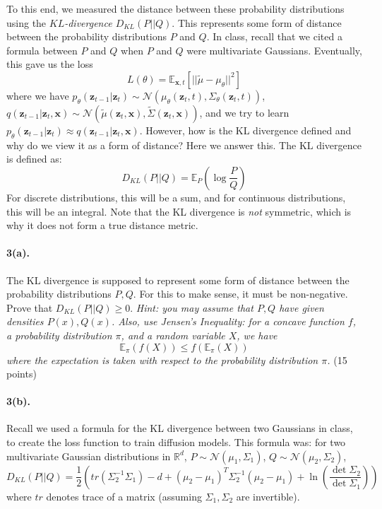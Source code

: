 \documentclass{article}
\begin{document}
To this end, we measured the distance between these probability distributions using the \textit{$KL$-divergence $D_{KL}(P||Q)$}. This represents some form of distance between the probability distributions $P$ and $Q$. In class, recall that we cited a formula between $P$ and $Q$ when $P$ and $Q$ were multivariate Gaussians. Eventually, this gave us the loss
\[ L(\theta) = \mathbb{E}_{\mathbf{x},t}[||\tilde{\mu}-\mu_{\theta}||^2]\]
where we have $p_{\theta}(\mathbf{z}_{t-1}|\mathbf{z}_t) \sim \mathcal{N}(\mu_{\theta}(\mathbf{z}_t,t),\Sigma_{\theta}(\mathbf{z}_t,t))$, $q(\mathbf{z}_{t-1}|\mathbf{z}_t, \mathbf{x}) \sim \mathcal{N}(\tilde{\mu}(\mathbf{z}_t,\mathbf{x}), \tilde{\Sigma}(\mathbf{z}_t,\mathbf{x}))$, and we try to learn $p_{\theta}(\mathbf{z}_{t-1}|\mathbf{z}_t) \approx q(\mathbf{z}_{t-1}|\mathbf{z}_t, \mathbf{x})$.
However, how is the KL divergence defined and why do we view it as a form of distance? Here we answer this. 
The KL divergence is defined as:
$$D_{KL}(P||Q) = \mathbb{E}_{P}\left(\log\frac{P}{Q}\right)$$
For discrete distributions, this will be a sum, and for continuous distributions, this will be an integral. Note that the KL divergence is \textit{not} symmetric, which is why it does not form a true distance metric.
\paragraph{3(a).}The KL divergence is supposed to represent some form of distance between the probability distributions $P, Q$. For this to make sense, it must be non-negative. Prove that $D_{KL}(P||Q) \ge 0$.
\textit{Hint: you may assume that $P, Q$ have given densities $P(x), Q(x)$. Also, use Jensen's Inequality: for a concave function $f$, a probability distribution $\pi$, and a random variable $X$, we have 
\[ \mathbb{E}_{\pi}(f(X)) \le f(\mathbb{E}_{\pi}(X))\]
where the expectation is taken with respect to the probability distribution $\pi$.} (15 points) \\

\paragraph{3(b).}Recall we used a formula for the KL divergence between two Gaussians in class, to create the loss function to train diffusion models. This formula was: for two multivariate Gaussian distributions in $\mathbb{R}^d$, $P \sim \mathcal{N}(\mu_1, \Sigma_1)$, $Q \sim \mathcal{N}(\mu_2, \Sigma_2)$,
\[ D_{KL}(P||Q) = \frac12\left(tr(\Sigma_2^{-1} \Sigma_1)-d+(\mu_2-\mu_1)^T \Sigma_2^{-1}(\mu_2-\mu_1)+\ln\left(\frac{\det \Sigma_2}{\det \Sigma_1}\right)\right)\]
where $tr$ denotes trace of a matrix (assuming $\Sigma_1, \Sigma_2$ are invertible). 
 
\end{document}
